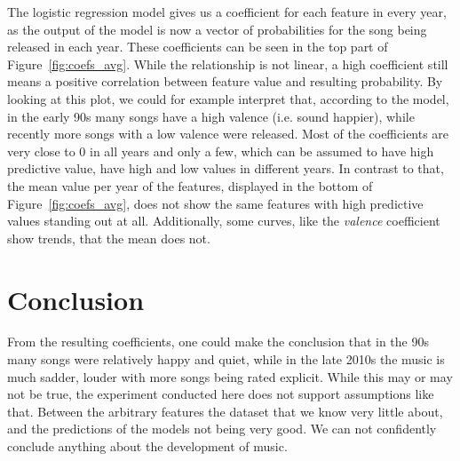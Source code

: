 \documentclass{article}
\begin{document}
The logistic regression model gives us a coefficient for each feature in every year, as the output of the model is now a vector of probabilities for the song being released in each year. These coefficients can be seen in the top part of Figure~\ref{fig:coefs_avg}. While the relationship is not linear, a high coefficient still means a positive correlation between feature value and resulting probability. By looking at this plot, we could for example interpret that, according to the model, in the early 90s many songs have a high valence (i.e. sound happier), while recently more songs with a low valence were released.
Most of the coefficients are very close to 0 in all years and only a few, which can be assumed to have high predictive value, have high and low values in different years. 
In contrast to that, the mean value per year of the features, displayed in the bottom of Figure~\ref{fig:coefs_avg}, does not show the same features with high predictive values standing out at all. Additionally, some curves, like the \emph{valence} coefficient show trends, that the mean does not.


\section{Conclusion}

From the resulting coefficients, one could make the conclusion that in the 90s many songs were relatively happy and quiet, while in the late 2010s the music is much sadder, louder with more songs being rated explicit. While this may or may not be true, the experiment conducted here does not support assumptions like that.
Between the arbitrary features the dataset that we know very little about, and the predictions of the models not being very good. We can not confidently conclude anything about the development of music.

 
\end{document}
